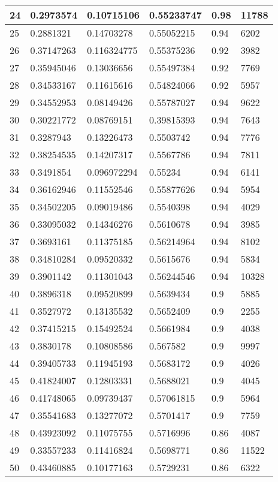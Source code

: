 \begin{longtable}{|l|l|l|l|l|l|}
24 & 0.2973574 & 0.10715106 & 0.55233747 & 0.98 & 11788 \\ \hline 
25 & 0.2881321 & 0.14703278 & 0.55052215 & 0.94 & 6202 \\ \hline 
26 & 0.37147263 & 0.116324775 & 0.55375236 & 0.92 & 3982 \\ \hline 
27 & 0.35945046 & 0.13036656 & 0.55497384 & 0.92 & 7769 \\ \hline 
28 & 0.34533167 & 0.11615616 & 0.54824066 & 0.92 & 5957 \\ \hline 
29 & 0.34552953 & 0.08149426 & 0.55787027 & 0.94 & 9622 \\ \hline 
30 & 0.30221772 & 0.08769151 & 0.39815393 & 0.94 & 7643 \\ \hline 
31 & 0.3287943 & 0.13226473 & 0.5503742 & 0.94 & 7776 \\ \hline 
32 & 0.38254535 & 0.14207317 & 0.5567786 & 0.94 & 7811 \\ \hline 
33 & 0.3491854 & 0.096972294 & 0.55234 & 0.94 & 6141 \\ \hline 
34 & 0.36162946 & 0.11552546 & 0.55877626 & 0.94 & 5954 \\ \hline 
35 & 0.34502205 & 0.09019486 & 0.5540398 & 0.94 & 4029 \\ \hline 
36 & 0.33095032 & 0.14346276 & 0.5610678 & 0.94 & 3985 \\ \hline 
37 & 0.3693161 & 0.11375185 & 0.56214964 & 0.94 & 8102 \\ \hline 
38 & 0.34810284 & 0.09520332 & 0.5615676 & 0.94 & 5834 \\ \hline 
39 & 0.3901142 & 0.11301043 & 0.56244546 & 0.94 & 10328 \\ \hline 
40 & 0.3896318 & 0.09520899 & 0.5639434 & 0.9 & 5885 \\ \hline 
41 & 0.3527972 & 0.13135532 & 0.5652409 & 0.9 & 2255 \\ \hline 
42 & 0.37415215 & 0.15492524 & 0.5661984 & 0.9 & 4038 \\ \hline 
43 & 0.3830178 & 0.10808586 & 0.567582 & 0.9 & 9997 \\ \hline 
44 & 0.39405733 & 0.11945193 & 0.5683172 & 0.9 & 4026 \\ \hline 
45 & 0.41824007 & 0.12803331 & 0.5688021 & 0.9 & 4045 \\ \hline 
46 & 0.41748065 & 0.09739437 & 0.57061815 & 0.9 & 5964 \\ \hline 
47 & 0.35541683 & 0.13277072 & 0.5701417 & 0.9 & 7759 \\ \hline 
48 & 0.43923092 & 0.11075755 & 0.5716996 & 0.86 & 4087 \\ \hline 
49 & 0.33557233 & 0.11416824 & 0.5698771 & 0.86 & 11522 \\ \hline 
50 & 0.43460885 & 0.10177163 & 0.5729231 & 0.86 & 6322 \\ \hline 
\end{longtable}